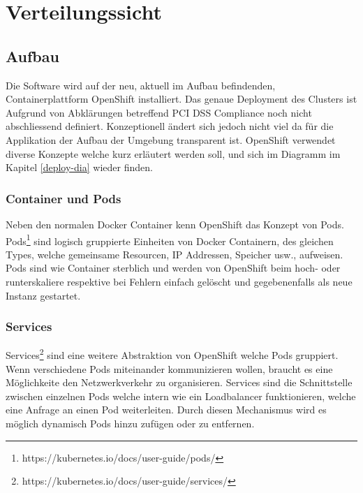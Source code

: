 \graphicspath{{./images/}}

\chapter{Verteilungssicht}
\label{deploy}

\section{Aufbau}
Die Software wird auf der neu, aktuell im Aufbau befindenden, Containerplattform OpenShift installiert. Das genaue Deployment des Clusters ist Aufgrund von Abklärungen betreffend PCI DSS Compliance noch nicht abschliessend definiert. Konzeptionell ändert sich jedoch nicht viel da für die Applikation der Aufbau der Umgebung transparent ist.
OpenShift verwendet diverse Konzepte welche kurz erläutert werden soll, und sich im Diagramm im Kapitel \ref{deploy-dia} wieder finden.

\subsection{Container und Pods}

Neben den normalen Docker Container kenn OpenShift das Konzept von Pods. Pods\footnote{https://kubernetes.io/docs/user-guide/pods/} sind logisch gruppierte Einheiten von Docker Containern, des gleichen Types, welche gemeinsame Resourcen, IP Addressen, Speicher usw.,  aufweisen. Pods sind wie Container sterblich und werden von OpenShift beim hoch- oder runterskaliere respektive bei Fehlern einfach gelöscht und gegebenenfalls als neue Instanz gestartet.

\subsection{Services}

Services\footnote{https://kubernetes.io/docs/user-guide/services/} sind eine weitere Abstraktion von OpenShift welche Pods gruppiert. Wenn verschiedene Pods miteinander kommunizieren wollen, braucht es eine Möglichkeite den Netzwerkverkehr zu organisieren. Services sind die Schnittstelle zwischen einzelnen Pods welche intern wie ein Loadbalancer funktionieren, welche eine Anfrage an einen Pod weiterleiten. Durch diesen Mechanismus wird es möglich dynamisch Pods hinzu zufügen oder zu entfernen.

